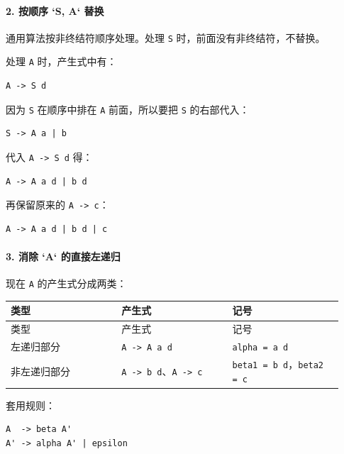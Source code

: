 \documentclass[UTF8]{ctexart}
\begin{document}
\paragraph*{2. 按顺序 `S, A` 替换}

通用算法按非终结符顺序处理。处理 \texttt{S} 时，前面没有非终结符，不替换。

处理 \texttt{A} 时，产生式中有：

\begin{Verbatim}[fontsize=\small,breaklines=true]
A -> S d
\end{Verbatim}

因为 \texttt{S} 在顺序中排在 \texttt{A} 前面，所以要把 \texttt{S} 的右部代入：

\begin{Verbatim}[fontsize=\small,breaklines=true]
S -> A a | b
\end{Verbatim}

代入 \texttt{A -> S d} 得：

\begin{Verbatim}[fontsize=\small,breaklines=true]
A -> A a d | b d
\end{Verbatim}

再保留原来的 \texttt{A -> c}：

\begin{Verbatim}[fontsize=\small,breaklines=true]
A -> A a d | b d | c
\end{Verbatim}

\paragraph*{3. 消除 `A` 的直接左递归}

现在 \texttt{A} 的产生式分成两类：

\begin{longtable}{|p{0.31\linewidth}|p{0.31\linewidth}|p{0.31\linewidth}|}
\hline
类型 & 产生式 & 记号 \\
\hline
\endfirsthead
类型 & 产生式 & 记号 \\
\hline
\endhead
左递归部分 & \texttt{A -> A a d} & \texttt{alpha = a d} \\
\hline
非左递归部分 & \texttt{A -> b d}、\texttt{A -> c} & \texttt{beta1 = b d}，\texttt{beta2 = c} \\
\hline
\end{longtable}

套用规则：

\begin{Verbatim}[fontsize=\small,breaklines=true]
A  -> beta A'
A' -> alpha A' | epsilon
\end{Verbatim}
\end{document}
